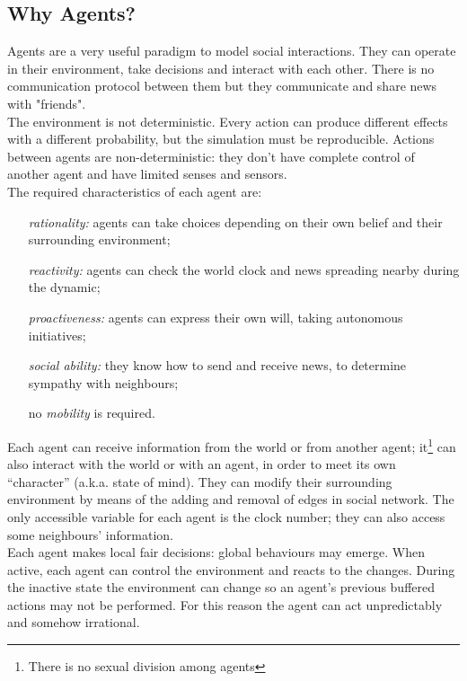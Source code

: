 \subsection{Why Agents?}\label{subsec:whyagents}
Agents are a very useful paradigm to model social
interactions.\cite{axtell2000agents}
They can operate in their environment, take decisions and interact with
each other.
There is no communication protocol between them but they communicate
and share news with "friends".\\
The environment is not deterministic. 
Every action can produce different effects with a different probability,
but the simulation must be reproducible.
Actions between agents are non-deterministic: they don't have complete
control of another agent and have limited senses and sensors.\\
The required characteristics of each agent
are:\cite{wooldridge1995intelligent}
%
\begin{itemize}
\item [\textit {rationality:}] agents can take choices depending on their
  own belief and their surrounding environment;
\item [\textit {reactivity:}] agents can check the world clock and news
  spreading nearby during the dynamic;
\item [\textit {proactiveness:}] agents can express their own will,
  taking autonomous initiatives;
\item [\textit {social ability:}] they know how to send and receive news,
  to determine sympathy with neighbours;
\item [no \textit{mobility}] is required. 
\end{itemize}
%
Each agent can receive information from the world or from another agent;
it\footnote{There is no sexual division among agents} can also interact
with the world or with an agent, in order to meet its own ``character''
(a.k.a. state of mind).
They can modify their surrounding environment by means of the adding
and removal of edges in social network.
The only accessible variable for each agent is the clock number; they
can also access some neighbours' information.\\
Each agent makes local fair decisions: global behaviours may emerge.
When active, each agent can control the environment and reacts to the changes. 
During the inactive state the environment can change so an agent's previous
buffered actions may not be performed.
For this reason the agent can act unpredictably and somehow irrational.
